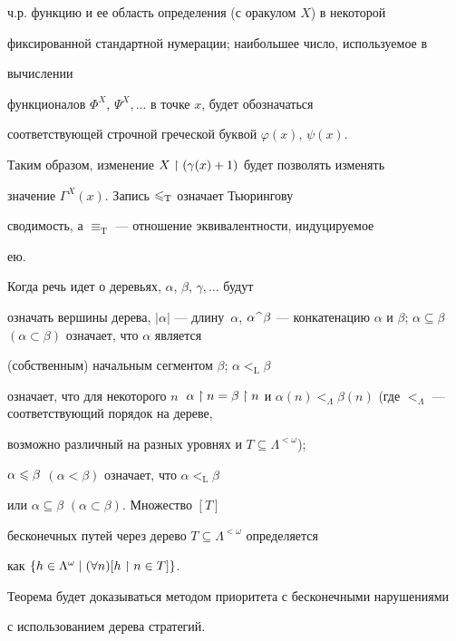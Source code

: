 ч.р. функцию и ее область определения (с оракулом $X$) в некоторой 


фиксированной стандартной нумерации; наибольшее число, используемое в 


вычислении


функционалов $\Phi^X$, $\Psi^X,\dotsc$ в точке $x$, будет обозначаться 


соответствующей строчной греческой буквой $\varphi(x)$, $\psi(x)$.


Таким образом, изменение $X\restriction(\gamma(x)+1)$ будет позволять изменять


значение $\Gamma^X(x)$. Запись $\leqslant_{\mathrm T}$ означает Тьюрингову


сводимость, а $\equiv_{\mathrm T}$ --- отношение эквивалентности, индуцируемое


ею. 





Когда речь идет о деревьях, $\alpha$, $\beta$, $\gamma,\dotsc$ будут 


означать вершины дерева, $|\alpha|$ --- длину~$\alpha$, $\con


{\alpha}{\beta}$ --- конкатенацию $\alpha$ и $\beta$; $\alpha


\subseteq\beta$ $(\alpha\subset\beta)$ означает, что $\alpha$ является


(собственным) начальным сегментом $\beta$; $\alpha<_{\mathrm L}\beta$ 


означает, что для некоторого $n\;$ ${\alpha\rst n}={\beta\rst n}$ и $\alpha(n)


<_{\Lambda}\beta(n)$ (где $<_{\Lambda}$ --- соответствующий порядок на дереве,


возможно различный на разных уровнях и $T\subseteq\Lambda^{<\omega}$);


$\alpha\leqslant\beta$ $(\alpha<\beta)$ означает, что $\alpha<_{\mathrm L}\beta$


или $\alpha\subseteq\beta$ $(\alpha\subset\beta)$. Множество $[T]$ 


бесконечных путей через дерево $T\subseteq\Lambda^{<\omega}$ определяется


как $\{h\in\Lambda^{\omega}\mid(\forall n)[{h\restriction n}\in T]\}$.


 


Теорема будет доказываться методом приоритета с бесконечными нарушениями


с использованием дерева стратегий. 



